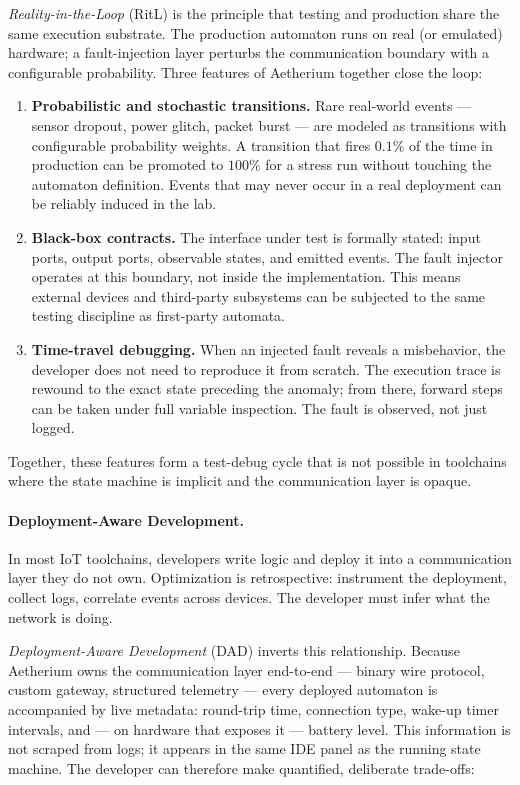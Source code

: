 \textit{Reality-in-the-Loop} (RitL) is the principle that testing and production share the same execution substrate. The production automaton runs on real (or emulated) hardware; a fault-injection layer perturbs the communication boundary with a configurable probability. Three features of Aetherium together close the loop:

\begin{enumerate}
  \item \textbf{Probabilistic and stochastic transitions.} Rare real-world events --- sensor dropout, power glitch, packet burst --- are modeled as transitions with configurable probability weights. A transition that fires $0.1\%$ of the time in production can be promoted to $100\%$ for a stress run without touching the automaton definition. Events that may never occur in a real deployment can be reliably induced in the lab.

  \item \textbf{Black-box contracts.} The interface under test is formally stated: input ports, output ports, observable states, and emitted events. The fault injector operates at this boundary, not inside the implementation. This means external devices and third-party subsystems can be subjected to the same testing discipline as first-party automata.

  \item \textbf{Time-travel debugging.} When an injected fault reveals a misbehavior, the developer does not need to reproduce it from scratch. The execution trace is rewound to the exact state preceding the anomaly; from there, forward steps can be taken under full variable inspection. The fault is observed, not just logged.
\end{enumerate}

Together, these features form a test-debug cycle that is not possible in toolchains where the state machine is implicit and the communication layer is opaque.

\paragraph{Deployment-Aware Development.}
\label{par:dad}
In most IoT toolchains, developers write logic and deploy it into a communication layer they do not own. Optimization is retrospective: instrument the deployment, collect logs, correlate events across devices. The developer must infer what the network is doing.

\textit{Deployment-Aware Development} (DAD) inverts this relationship. Because Aetherium owns the communication layer end-to-end --- binary wire protocol, custom gateway, structured telemetry --- every deployed automaton is accompanied by live metadata: round-trip time, connection type, wake-up timer intervals, and --- on hardware that exposes it --- battery level. This information is not scraped from logs; it appears in the same IDE panel as the running state machine. The developer can therefore make quantified, deliberate trade-offs:

